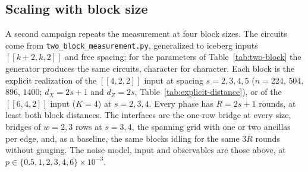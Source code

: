 \documentclass[aps,prx,reprint,superscriptaddress,nofootinbib,floatfix,longbibliography]{revtex4-2}
\theoremstyle{definition}
\begin{document}
\subsection{Scaling with block size}
\label{sec:two-block-scaling}
A second campaign repeats the measurement at four block sizes.  The circuits
come from \texttt{two\_block\_measurement.py}, generalized to iceberg inputs
$[[k+2,k,2]]$ and free spacing; for the parameters of
Table~\ref{tab:two-block} the generator produces the same circuits,
character for character.  Each block is the explicit realization of the
$[[4,2,2]]$ input at spacing $s=2,3,4,5$ ($n=224$, $504$, $896$, $1400$;
$d_X=2s+1$ and $d_Z=2s$, Table~\ref{tab:explicit-distance}), or of the
$[[6,4,2]]$ input ($K=4$) at $s=2,3,4$.  Every phase has $R=2s+1$ rounds, at
least both block distances.  The interfaces are the one-row bridge at every
size, bridges of $w=2,3$ rows at $s=3,4$, the spanning grid with one or two
ancillas per edge, and, as a baseline, the same blocks idling for the same
$3R$ rounds without gauging.  The noise model, input and observables are
those above, at $p\in\{0.5,1,2,3,4,6\}\times10^{-3}$.
\end{document}
